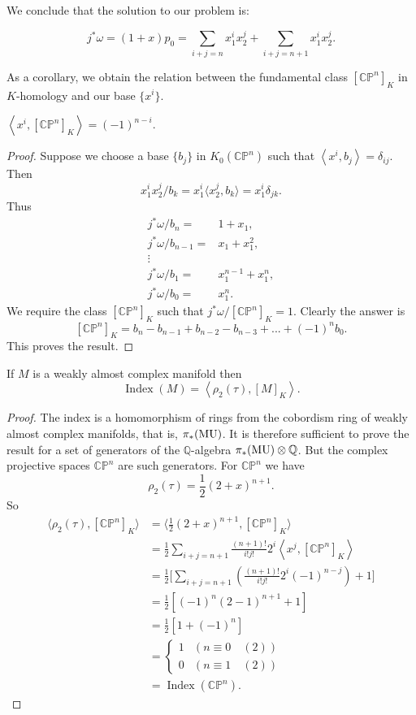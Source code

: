 \documentclass[../main]{subfiles}
\begin{document}
We conclude that the solution to our problem is:
\begin{theorem}\label{thm:p3ch11.14}
\[j^\ast \omega=(1+x)p_0=\sum_{i+j=n}x_1^ix_2^j + \sum_{i+j=n+1}x_1^ix_2^j.\]
\end{theorem}
As a corollary, we obtain the relation between the fundamental class $[\mathbb{CP}^n]_K$ in $K$-homology and our base $\{x^i\}$.
\begin{theorem}\label{thm:p3ch11.15}
$\left<x^i,[\mathbb{CP}^n]_K\right>=(-1)^{n-i}.$
\end{theorem}
\begin{proof}
Suppose we choose a base $\{b_j\}$ in $K_0(\mathbb{CP}^n)$ such that $\left<x^i,b_j\right>=\delta_{ij}.$ Then 
\[x_1^ix_2^j/b_k=x_1^i\langle x_2^j,b_k\rangle =x_1^i\delta_{jk}.\]
Thus 
\begin{align}
    j^\ast \omega/b_n =& 1 + x_1, \nonumber \\
    j^\ast \omega/b_{n-1} =& x_1 + x_1^2, \nonumber \\
    \vdots& \nonumber\\
    j^\ast \omega/b_1 =& x_1^{n-1}+x_1^n, \nonumber \\
    j^\ast \omega/b_0 =& x_1^n. \nonumber
\end{align}
We require the class $[\mathbb{CP}^n]_K$ such that $j^\ast \omega/[\mathbb{CP}^n]_K=1$. Clearly the answer is
\[[\mathbb{CP}^n]_K=b_n-b_{n-1}+b_{n-2}-b_{n-3}+...+(-1)^n b_0.\]
This proves the result.
\end{proof}
\begin{theorem} \label{thm:p3ch11.16}
If $M$ is a weakly almost complex manifold then
\[\operatorname{Index}(M)=\left<\rho_2(\tau), [M]_K\right>.\]
\end{theorem}
\begin{proof}
The index is a homomorphism of rings from the cobordism ring of weakly almost complex manifolds, that is, $\pi_\ast(\mathrm{MU})$. It is therefore sufficient to prove the result for a set of generators of the $\mathbb{Q}$-algebra $\pi_\ast (\mathrm{MU})\otimes \mathbb{Q}$. But the complex projective spaces $\mathbb{CP}^n$ are such generators. For $\mathbb{CP}^n$ we have 
\[\rho_2(\tau)=\frac{1}{2}(2+x)^{n+1}.\]
So 
\begin{align*} 
\bigg\langle\rho_2(\tau),[\mathbb{CP}^n]_K\bigg\rangle &= \bigg\langle\frac{1}{2}(2+x)^{n+1},[\mathbb{CP}^n]_K\bigg\rangle \nonumber \\
&= \frac{1}{2}\sum_{i+j=n+1}\frac{(n+1)!}{i!j!}2^i\left<x^j,[\mathbb{CP}^n]_K\right> \nonumber \\
&= \frac{1}{2}\bigg[\sum_{i+j=n+1}\left(\frac{(n+1)!}{i!j!}2^i(-1)^{n-j}\right) + 1\bigg] \nonumber \\
&= \frac{1}{2}\left[(-1)^n(2-1)^{n+1}+1\right] \nonumber \\
&= \frac{1}{2}\left[1+(-1)^n\right] \nonumber \\
&= \begin{cases}
  1  & (n\equiv 0 \quad (2)) \\
  0 & (n\equiv 1 \quad (2))
\end{cases} \nonumber \\
&=\operatorname{Index}(\mathbb{CP}^n).
\end{align*}
\end{proof}
\end{document}
